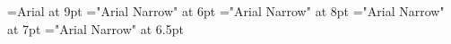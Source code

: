 \font\helv=Arial at 9pt
\font\helvx="Arial Narrow" at 6pt
\font\helvy="Arial Narrow" at 8pt
\font\helvz="Arial Narrow" at 7pt
\font\helvzz="Arial Narrow" at 6.5pt

\def\ofs#1#2#3{}
\let\ofspc\pcxxv
\let\redpc\pcfee
\let\newgh\pcblu

\long{}

\let\pageno\page

\newcount\ltfirstpage



  \pcsltabinit
  \nocotabinit
 \seqdbtabinit


\def\Hstrut{\vrule height12pt depth5pt width0pt}
\def\tvrule{\vrule}
\def\tvrulex{\vrule width1pt\relax}
\def\tablerule{\noalign{\allowbreak\hrule}}
\def\thead{\Sans\nine\rm}
\def\theadrule{\noalign{\hrule height1pt\relax}}
\def\tbodybreak{\noalign{\allowbreak}}

\let\fourteen\Large
\let\twelve\large
\let\ten\normal
\let\nine\small
\let\eight\small
\let\seven\small
\let\six\footnotesize

\let\Sans\sf

\def\Hsub#1{\textsubscript{#1}}

\def\cdlighnopng{\vbox{\vfil\hbox{(-)\hfil}\vfil}}

\def\cvi{\pcseqi}
\def\cvii{\pcseqii}
\def\cviii{\pcseqiii}
\def\cviv{\pcseqiv}
\def\cvv{\pcseqv}
\def\cvvi{\pccvvi}
\def\cvxcix{\pccvxcix}
\def\cvxcviii{\pccvxcviii}

\def\cv#1#2{%
  \ifnum#2=1\cvi
  \else
    \ifnum#2=2\cvii
    \else
      \ifnum#2=3\cviii
      \else
        \ifnum#2=4\cviv
        \else
          \ifnum#2=5\cvv
          \else
            \ifnum#2=6\cvvi
            \else
              \ifnum#2=8\cvxcviii
              \else
                \ifnum#2=9\cvxcix\fi
              \fi
            \fi
          \fi
        \fi
      \fi
    \fi
  \fi
}


\def\beginDisplay{\begingroup\narrower}
\def\endDisplay{\endgroup}

\let\preamble\relax
\let\sectionsintocfalse\relax
\let\subsectionsintocfalse\relax
\let\useapp\relax

\def\xgraphicsfigure#1#2#3#4{}


\let\ccempty\relax

\def\code#1{{\small\sf#1}}

